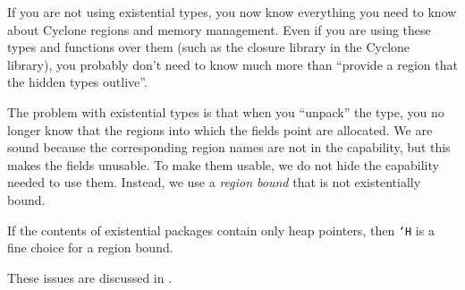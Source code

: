 If you are not using existential types, you now know everything you
need to know about Cyclone regions and memory management.  Even if you
are using these types and functions over them (such as the closure
library in the Cyclone library), you probably don't need to know much more
than ``provide a region that the hidden types outlive''.

The problem with existential types is that when you ``unpack'' the
type, you no longer know that the regions into which the fields point
are allocated.  We are sound because the corresponding region names
are not in the capability, but this makes the fields unusable.  To
make them usable, we do not hide the capability needed to use them.
Instead, we use a \emph{region bound} that is not existentially
bound.  

If the contents of existential packages contain only heap pointers,
then \texttt{`H} is a fine choice for a region bound.

These issues are discussed in .






